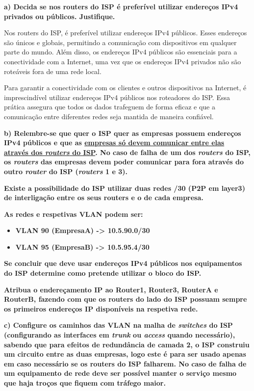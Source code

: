 \documentclass[11pt,english, openright, oneside]{book}
\begin{document}
\textbf{a) Decida se nos routers do ISP é preferível utilizar endereços IPv4 privados ou públicos. Justifique.}
\vspace{0.2cm}

Nos routers do ISP, é preferível utilizar endereços IPv4 públicos. Esses endereços são únicos e globais, permitindo a comunicação com dispositivos em qualquer parte do mundo. Além disso, os endereços IPv4 públicos são essenciais para a conectividade com a Internet, uma vez que os endereços IPv4 privados não são roteáveis fora de uma rede local.

Para garantir a conectividade com os clientes e outros dispositivos na Internet, é imprescindível utilizar endereços IPv4 públicos nos roteadores do ISP. Essa prática assegura que todos os dados trafeguem de forma eficaz e que a comunicação entre diferentes redes seja mantida de maneira confiável.
\vspace{0.8cm}

\textbf{b) Relembre-se que quer o ISP quer as empresas possuem endereços IPv4 públicos e que as \underline{empresas só devem comunicar entre elas através dos \textit{routers} do ISP}. No caso de falha de um dos \textit{routers} do ISP, os \textit{routers} das empresas devem poder comunicar para fora através do outro \textit{router} do ISP (\textit{routers} 1 e 3).}

\textbf{Existe a possibilidade do ISP utilizar duas redes /30 (P2P em layer3) de interligação entre os seus routers e o de cada empresa.}

\textbf{As redes e respetivas VLAN podem ser: }
\begin{itemize}
    \item \textbf{VLAN 90 (EmpresaA) -> 10.5.90.0/30 }
    \item \textbf{VLAN 95 (EmpresaB) -> 10.5.95.4/30 }
\end{itemize}

\textbf{Se concluir que deve usar endereços IPv4 públicos nos equipamentos do ISP determine como pretende utilizar o bloco do ISP.}

\textbf{Atribua o endereçamento IP ao Router1, Router3, RouterA e RouterB, fazendo com que os routers do lado do ISP possuam sempre os primeiros endereços IP disponíveis na respetiva rede.}
\vspace{0.2cm}

\vspace{0.8cm}

\textbf{c) Configure os caminhos das VLAN na malha de \textit{switches} do ISP (configurando as interfaces em \textit{trunk} ou \textit{access} quando necessário), sabendo que para efeitos de redundância de camada 2, o ISP construiu um circuito entre as duas empresas, logo este é para ser usado apenas em caso necessário se os routers do ISP falharem. No caso de falha de um equipamento de rede deve ser possível manter o serviço mesmo que haja troços que fiquem com tráfego maior.}
\vspace{0.2cm}
\end{document}
